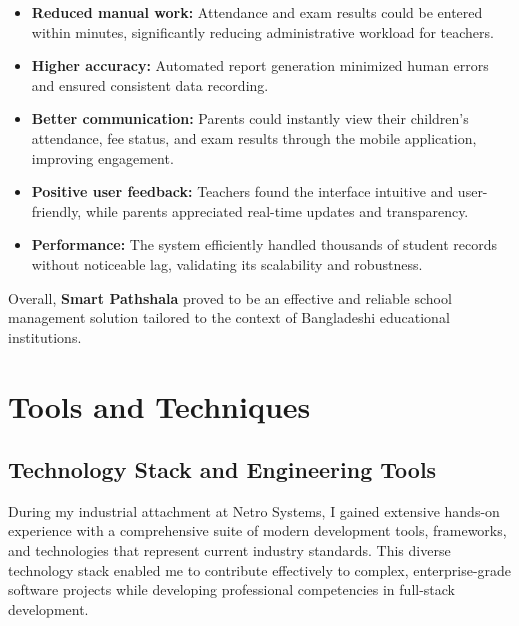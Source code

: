 \documentclass[12pt,a4paper]{report}
\newcommand{\project}[1]{\textcolor{projectcolor}{\textbf{#1}}}
\newenvironment{coloritemize}
{\begin{itemize}[label=\textcolor{primaryblue}{$\bullet$}]}
{\end{itemize}}
\begin{document}
\begin{coloritemize}
    \item \textcolor{secondaryblue}{\textbf{Reduced manual work:}} Attendance and exam results could be entered within minutes, significantly reducing administrative workload for teachers.
    \item \textcolor{secondaryblue}{\textbf{Higher accuracy:}} Automated report generation minimized human errors and ensured consistent data recording.
    \item \textcolor{secondaryblue}{\textbf{Better communication:}} Parents could instantly view their children’s attendance, fee status, and exam results through the mobile application, improving engagement.
    \item \textcolor{secondaryblue}{\textbf{Positive user feedback:}} Teachers found the interface intuitive and user-friendly, while parents appreciated real-time updates and transparency.
    \item \textcolor{secondaryblue}{\textbf{Performance:}} The system efficiently handled thousands of student records without noticeable lag, validating its scalability and robustness.
\end{coloritemize}

Overall, \project{Smart Pathshala} proved to be an effective and reliable school management solution tailored to the context of Bangladeshi educational institutions.


\chapter{Tools and Techniques}
\section{Technology Stack and Engineering Tools}
During my industrial attachment at Netro Systems, I gained extensive hands-on experience with a comprehensive suite of modern development tools, frameworks, and technologies that represent current industry standards. This diverse technology stack enabled me to contribute effectively to complex, enterprise-grade software projects while developing professional competencies in full-stack development.
\end{document}
